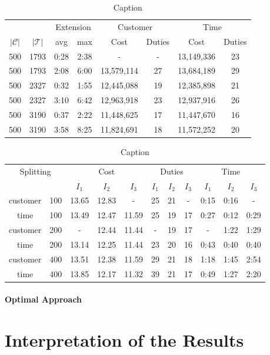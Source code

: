 \begin{table}[htb]
	\centering
	\begin{tabular}{cccccccc}
		\toprule
		&& \multicolumn{2}{c}{Extension} & \multicolumn{2}{c}{Customer} & \multicolumn{2}{c}{Time} \\
		\cmidrule(r){3-8}
		$\vert\mathcal{C}\vert$ & $\vert\mathcal{T}\vert$ & avg & max & Cost & Duties & Cost & Duties \\
		\midrule
		500 & 1793 & 0:28 & 2:38 &  -         & -  & 13,149,336 & 23 \\
		500 & 1793 & 2:08 & 6:00 & 13,579,114 & 27 & 13,684,189 & 29 \\
		500 & 2327 & 0:32 & 1:55 & 12,445,088 & 19 & 12,385,898 & 21 \\
		500 & 2327 & 3:10 & 6:42 & 12,963,918 & 23 & 12,937,916 & 26 \\
		500 & 3190 & 0:37 & 2:22 & 11,448,625 & 17 & 11,447,670 & 16 \\
		500 & 3190 & 3:58 & 8:25 & 11,824,691 & 18 & 11,572,252 & 20 \\
		\bottomrule
	\end{tabular}
	\caption{Caption}
\end{table}

\begin{table}[htb]
	\centering
	\begin{tabular}{cc|ccc|ccc|ccc}
		\toprule
		\multicolumn{2}{c}{Splitting} & \multicolumn{3}{c}{Cost} & \multicolumn{3}{c}{Duties} & \multicolumn{3}{c}{Time} \\
		\cmidrule(r){3-11}
		&& $I_1$ & $I_2$ & $I_3$ & $I_1$ & $I_2$ & $I_3$ & $I_1$ & $I_2$ & $I_3$ \\
		\midrule
		customer & 100  &  13.65 & 12.83 &   -    &  25 & 21 & -   &  0:15 & 0:16 &  -   \\
		time     & 100  &  13.49 & 12.47 & 11.59  &  25 & 19 & 17  &  0:27 & 0:12 & 0:29 \\
		customer & 200  &    -   & 12.44 & 11.44  &  -  & 19 & 17  &   -   & 1:22 & 1:29 \\
		time     & 200  &  13.14 & 12.25 & 11.44  &  23 & 20 & 16  &  0:43 & 0:40 & 0:40 \\
		customer & 400  &  13.51 & 12.38 & 11.59  &  29 & 21 & 18  &  1:18 & 1:45 & 2:54 \\
		time     & 400  &  13.85 & 12.17 & 11.32  &  39 & 21 & 17  &  0:49 & 1:27 & 2:20 \\
		\bottomrule
	\end{tabular}
	\caption{Caption}
\end{table}

\paragraph{Optimal Approach} \parfill


\section{Interpretation of the Results}